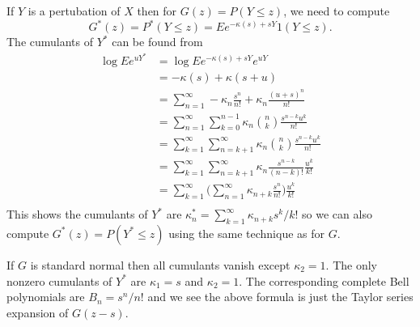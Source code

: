 \documentclass[11pt]{article}
\theoremstyle{definition}
\begin{document}
If \(Y\) is a pertubation of \(X\) then
for \(G(z) = P(Y\le z)\), we need to compute
\[
G^*(z) = P^*(Y\le z) = Ee^{-\kappa(s) + sY}1(Y\le z).
\]
The cumulants of \(Y^*\) can be found from
\begin{align*}
\log E e^{uY^*} &= \log E e^{-\kappa(s) + s Y} e^{uY}\\
&= -\kappa(s) + \kappa(s + u)\\
&= \sum_{n=1}^\infty -\kappa_n \frac{s^n}{n!} 
	+ \kappa_n \frac{(u + s)^n}{n!}\\
&= \sum_{n=1}^\infty \sum_{k=0}^{n-1} \kappa_n \binom{n}{k}
	\frac{s^{n - k}u^k}{n!}\\
&= \sum_{k=1}^\infty \sum_{n=k + 1}^\infty \kappa_n 
	\binom{n}{k}\frac{s^{n - k}u^k}{n!}\\
&= \sum_{k=1}^\infty \sum_{n=k + 1}^\infty \kappa_n \frac{s^{n-k}}{(n-k)!}
	\frac{u^k}{k!}\\
&= \sum_{k=1}^\infty 
	\bigl(\sum_{n=1}^\infty \kappa_{n+k} \frac{s^n}{n!}\bigr)
	\frac{u^k}{k!}\\
\end{align*}
This shows the cumulants of \(Y^*\) are 
\(\kappa^*_n = \sum_{k=1}^\infty \kappa_{n + k}s^k/k!\)
so we can also compute \(G^*(z) = P(Y^* \le z)\) using the same
technique as for \(G\).

If \(G\) is standard normal then all cumulants vanish except \(\kappa_2 = 1\).
The only nonzero cumulants of \(Y^*\) are \(\kappa_1 = s\)
and \(\kappa_2 = 1\). The corresponding complete Bell polynomials
are \(B_n = s^n/n!\) and we see the above formula is just
the Taylor series expansion of \(G(z - s)\).
%
%
\end{document}
